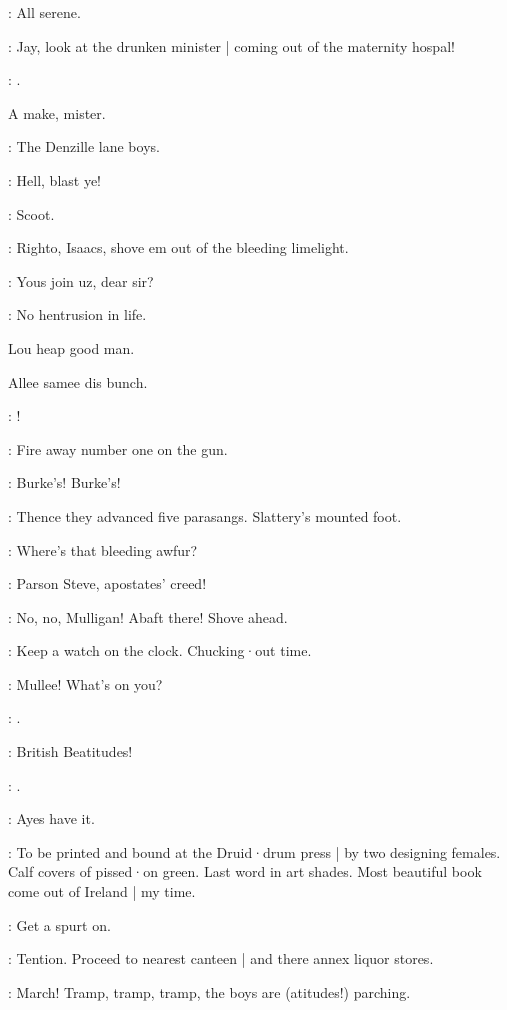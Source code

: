 :
All serene.

\bystander:
Jay,
look at the drunken minister |
coming out of the maternity hospal!

\mulligan:
.

\bystander
A make,
mister.

\dixon:
The Denzille lane boys.

\crotthers:
Hell,
blast ye!

\madden:
Scoot.

\barman:
Righto,
Isaacs,
shove em out of the bleeding limelight.

\punch:
Yous join uz,
dear sir?

\lynch:
No hentrusion in life.

\begin{omitted}
Lou heap good man.

Allee samee dis bunch.
\end{omitted}

\bannon:
!

\lenehan:
Fire away number one on the gun.

\All:
Burke's!
Burke's!

:
Thence they advanced five parasangs.
Slattery's mounted foot.

\crotthers:
Where's that bleeding awfur?

\dixon:
Parson Steve,
apostates' creed!

\lynch:
No,
no,
Mulligan!
Abaft there!
Shove ahead.

\lenehan:
Keep a watch on the clock.
Chucking·out time.

\madden:
Mullee!
What's on you?

\mulligan:
.

\bannon:
British Beatitudes!

\mulligan:
.

\punch:
Ayes have it.

\stephen:
To be printed and bound at the Druid·drum press |
by two designing females.
Calf covers of pissed·on green.
Last word in art shades.
Most beautiful book come out of Ireland |
my time.

\crotthers:
\/
Get a spurt on.

\lenehan:
Tention.
Proceed to nearest canteen |
and there annex liquor stores.

\punch:
March!
Tramp,
tramp,
tramp,
the boys are
(atitudes!)
parching.

